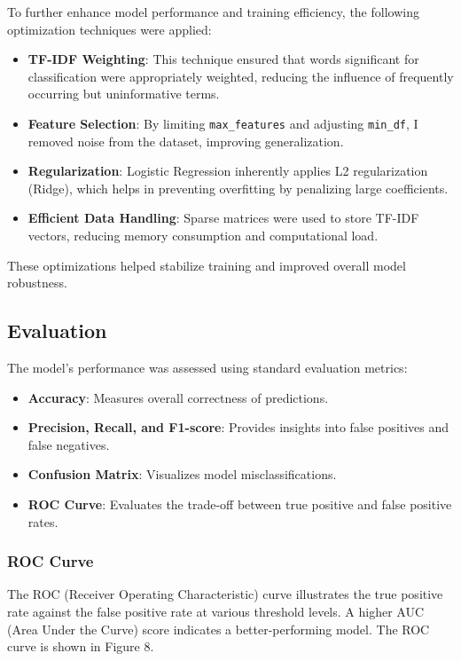 \documentclass[12pt]{fphw}
\begin{document}
To further enhance model performance and training efficiency, the following optimization techniques were applied:
\begin{itemize}
    \item \textbf{TF-IDF Weighting}: This technique ensured that words significant for classification were appropriately weighted, reducing the influence of frequently occurring but uninformative terms.
    \item \textbf{Feature Selection}: By limiting \texttt{max\_features} and adjusting \texttt{min\_df}, I removed noise from the dataset, improving generalization.
    \item \textbf{Regularization}: Logistic Regression inherently applies L2 regularization (Ridge), which helps in preventing overfitting by penalizing large coefficients.
    \item \textbf{Efficient Data Handling}: Sparse matrices were used to store TF-IDF vectors, reducing memory consumption and computational load.
\end{itemize}

These optimizations helped stabilize training and improved overall model robustness.

\subsection{Evaluation}

The model's performance was assessed using standard evaluation metrics:
\begin{itemize}
    \item \textbf{Accuracy}: Measures overall correctness of predictions.
    \item \textbf{Precision, Recall, and F1-score}: Provides insights into false positives and false negatives.
    \item \textbf{Confusion Matrix}: Visualizes model misclassifications.
    \item \textbf{ROC Curve}: Evaluates the trade-off between true positive and false positive rates.
\end{itemize}

\subsubsection{ROC Curve}
The ROC (Receiver Operating Characteristic) curve illustrates the true positive rate against the false positive rate at various threshold levels. A higher AUC (Area Under the Curve) score indicates a better-performing model. The ROC curve is shown in Figure 8.
\end{document}
